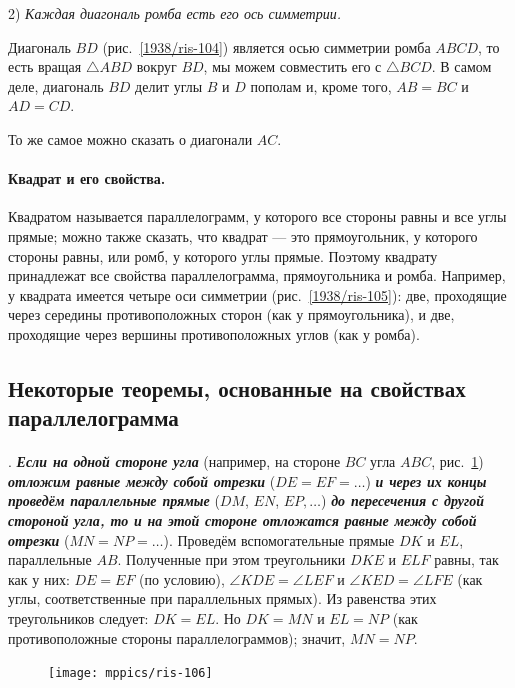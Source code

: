 \documentclass[oneside]{book}
\begin{document}
2) \emph{Каждая диагональ ромба есть его ось симметрии.}

Диагональ $BD$ (рис.~\ref{1938/ris-104}) является осью симметрии ромба $ABCD$,
то есть вращая $\triangle ABD$ вокруг $BD$, мы можем совместить его с $\triangle BCD$.
В самом деле, диагональ $BD$ делит углы $B$ и $D$ пополам и, кроме того, $AB=BC$ и $AD=CD$.

То же самое можно сказать о диагонали $AC$.

\paragraph{Квадрат и его свойства.}\label{1938/94}
Квадратом называется параллелограмм, у которого все стороны равны и все углы прямые;
можно также сказать, что квадрат — это прямоугольник, у которого стороны равны, или ромб, у которого углы прямые.
Поэтому квадрату принадлежат все свойства параллелограмма, прямоугольника и ромба.
Например, у квадрата имеется четыре оси симметрии (рис.~\ref{1938/ris-105}):
две, проходящие через середины противоположных сторон (как у прямоугольника), и две, проходящие через вершины противоположных углов (как у ромба).

\subsection*{Некоторые теоремы, основанные на свойствах параллелограмма}

\paragraph{}\label{1938/95}
.
\textbf{\emph{Если на одной стороне угла}} (например, на стороне $BC$ угла $ABC$, рис.~\ref{1938/ris-106}) \textbf{\emph{отложим равные между собой отрезки}} ($DE=EF=\dots$) \textbf{\emph{и через их концы проведём параллельные прямые}} ($DM$, $EN$, $EP,\dots$) \textbf{\emph{до пересечения с другой стороной угла, то и на этой стороне отложатся равные между собой отрезки}} ($MN=NP=\dots$).
Проведём вспомогательные прямые $DK$ и $EL$, параллельные $AB$.
Полученные при этом треугольники $DKE$ и $ELF$ равны, так как у них:
$DE=EF$ (по условию), $\angle KDE=\angle LEF$ и $\angle KED = \angle LFE$ (как углы, соответственные при параллельных прямых).
Из равенства этих треугольников следует:
$DK=EL$.
Но $DK=MN$ и $EL=NP$ (как противоположные стороны параллелограммов);
значит, $MN=NP$.

\begin{figure}[h!]
\centering
\texttt{[image: mppics/ris-106]}
\caption{}\label{1938/ris-106}
\end{figure}
\end{document}
